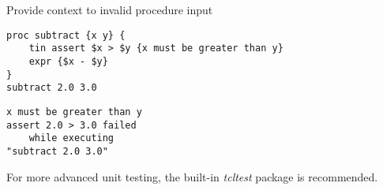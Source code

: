 \documentclass{article}
\begin{document}
\begin{example}{Provide context to invalid procedure input}
\begin{lstlisting}
proc subtract {x y} {
    tin assert $x > $y {x must be greater than y}
    expr {$x - $y}
}
subtract 2.0 3.0
\end{lstlisting} 
\tcblower
\begin{lstlisting}
x must be greater than y
assert 2.0 > 3.0 failed
    while executing
"subtract 2.0 3.0"
\end{lstlisting}
\end{example}
For more advanced unit testing, the built-in \textit{tcltest} package is recommended.
\end{document}
